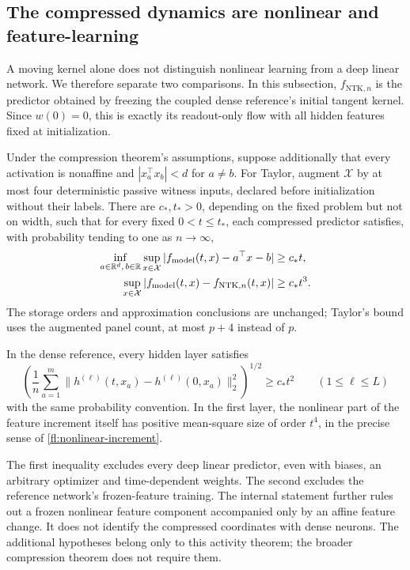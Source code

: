 \subsection{The compressed dynamics are nonlinear and feature-learning}
\label{sec:nonlinear-learning}

A moving kernel alone does not distinguish nonlinear learning from a deep
linear network. We therefore separate two comparisons. In this subsection,
$f_{\mathrm{NTK},n}$ is the predictor obtained by freezing the coupled
dense reference's initial tangent kernel. Since $w(0)=0$, this is exactly its readout-only flow
with all hidden features fixed at initialization.

\begin{samepage}
\begin{theorem}
\label{thm:nonlinear-learning}
Under the compression theorem's assumptions, suppose additionally that every
activation is nonaffine and $|x_a^\top x_b|<d$ for $a\ne b$.
For Taylor, augment $\mathcal X$ by at most four deterministic passive
witness inputs, declared before initialization without their labels.
There are $c_*,t_*>0$, depending on the fixed problem but not on width,
such that for every fixed $0<t\le t_*$, each compressed predictor satisfies,
with probability tending to one as $n\to\infty$,
\begin{align}
 \inf_{a\in\mathbb R^d,\,b\in\mathbb R}\sup_{x\in\mathcal X}
 |f_{\rm model}(t,x)-a^\top x-b|&\ge c_*t,
 \label{fl:input-gap}\\
 \sup_{x\in\mathcal X}
 |f_{\rm model}(t,x)-f_{\mathrm{NTK},n}(t,x)|&\ge c_*t^3.
 \label{fl:kernel-gap}
\end{align}
The storage orders and approximation conclusions are unchanged; Taylor's
bound uses the augmented panel count, at most $p+4$ instead of $p$.

In the dense reference, every hidden layer satisfies
\begin{equation}
 \left(\frac1n\sum_{a=1}^m
 \|h^{(\ell)}(t,x_a)-h^{(\ell)}(0,x_a)\|_2^2\right)^{1/2}
 \ge c_*t^2\qquad(1\le\ell\le L)
 \label{fl:layer-motion}
\end{equation}
with the same probability convention. In the first layer, the nonlinear
part of the feature increment itself has positive mean-square size of order
$t^4$, in the precise sense of \eqref{fl:nonlinear-increment}.
\end{theorem}
\end{samepage}

The first inequality excludes every deep linear predictor, even with biases,
an arbitrary optimizer and time-dependent weights. The second excludes the
reference network's frozen-feature training. The internal statement further
rules out a frozen nonlinear feature component accompanied only by an affine
feature change. It does not identify the compressed coordinates with dense
neurons. The additional hypotheses belong only to this activity theorem;
the broader compression theorem does not require them.


